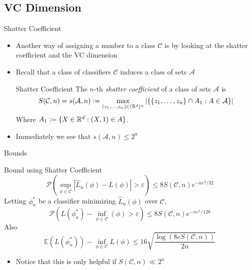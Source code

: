 \documentclass{beamer}
\renewcommand{\Pr}[1]{\mathcal{P} \left( #1 \right)}
\newcommand{\cls}{\mathcal{C}}
\newcommand{\E}[1]{\mathbb{E}\left( #1 \right)}
\newcommand{\R}{\mathbb{R}}
\newcommand{\defeq}{\vcentcolon=}
\newcommand{\abs}[1]{\left| #1 \right|}
\newcommand{\br}[1]{\left\{ #1 \right\} }
\newcommand{\eps}{\varepsilon}
\begin{document}
\subsection{VC Dimension}
\begin{frame}{Shatter Coefficient}
\begin{itemize}
\item Another way of assigning a number to a class $\cls$ is by looking at the shatter coefficient and the VC dimension
\item Recall that a class of classifiers $\cls$ induces a class of sets $\mathcal A$
\begin{block}{Shatter Coefficient}
The $n$-th \emph{shatter coefficient} of a class of sets $\mathcal{A}$ is
\[ S(\cls, n) = s(\mathcal A, n) \defeq \max_{(z_1,\ldots,z_n)\in (\R^d)^n} \abs{ \br{ \br{z_1, \ldots, z_n} \cap A_1 : A \in \mathcal A}} \]
Where $A_1 \defeq \{X \in \R^d : (X,1) \in A\}$.
\end{block}
\item Immediately we see that $s(\mathcal A, n) \leq 2^n$
\end{itemize}
\end{frame}


\begin{frame}{Bounds}
\begin{block}{Bound using Shatter Coefficient}
\[ \Pr{ \sup_{\phi \in \cls} \abs{ \hat{L}_n (\phi) - L(\phi)} > \eps } \leq 8 S(\cls, n) e^{-n\eps^2/32} \]
Letting $\phi_n^*$ be a classifier minimizing $\hat{L}_n(\phi)$ over $\cls$,
\[ \Pr{ L(\phi^*_n) - \inf_{\phi \in \cls} (\phi) > \eps } \leq 8 S(\cls,n)e^{-n\eps^2/128} \]
Also
\[ \E{L(\phi^*_n)} - \inf_{\phi\in\cls} L(\phi) \leq 16 \sqrt{\frac{\log(8eS(\cls, n))}{2n}} \]
\end{block}
\begin{itemize}
\item Notice that this is only helpful if $S(\cls,n) \ll 2^n$
\end{itemize}
\end{frame}
\end{document}
